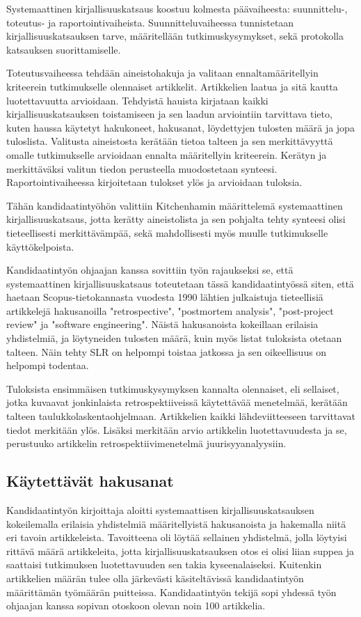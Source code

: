 Systemaattinen kirjallisuuskatsaus koostuu kolmesta päävaiheesta: suunnittelu-, toteutus- ja raportointivaiheista. Suunnitteluvaiheessa tunnistetaan kirjallisuuskatsauksen tarve, määritellään tutkimuskysymykset, sekä protokolla katsauksen suorittamiselle. \citep{Kitchenham2007}

Toteutusvaiheessa tehdään aineistohakuja ja valitaan ennaltamääritellyin kriteerein tutkimukselle olennaiset artikkelit. Artikkelien laatua ja sitä kautta luotettavuutta arvioidaan. Tehdyistä hauista kirjataan kaikki kirjallisuuskatsauksen toistamiseen ja sen laadun arviointiin tarvittava tieto, kuten haussa käytetyt hakukoneet, hakusanat, löydettyjen tulosten määrä ja jopa tuloslista. Valitusta aineistosta kerätään tietoa talteen ja sen merkittävyyttä omalle tutkimukselle arvioidaan ennalta määritellyin kriteerein. Kerätyn ja merkittäväksi valitun tiedon perusteella muodostetaan synteesi. Raportointivaiheessa kirjoitetaan tulokset ylös ja arvioidaan tuloksia. \citep{Kitchenham2007}

Tähän kandidaatintyöhön valittiin Kitchenhamin määrittelemä systemaattinen kirjallisuuskatsaus, jotta kerätty aineistolista ja sen pohjalta tehty synteesi olisi tieteellisesti merkittävämpää, sekä mahdollisesti myös muulle tutkimukselle käyttökelpoista.

Kandidaatintyön ohjaajan kanssa sovittiin työn rajaukseksi se, että systemaattinen kirjallisuuskatsaus toteutetaan tässä kandidaatintyössä siten, että haetaan Scopus-tietokannasta vuodesta 1990 lähtien julkaistuja tieteellisiä artikkelejä hakusanoilla "retrospective",  "postmortem analysis", "post-project review" ja "software engineering". Näistä hakusanoista kokeillaan erilaisia yhdistelmiä, ja löytyneiden tulosten määrä, kuin myös listat tuloksista otetaan talteen. Näin tehty SLR on helpompi toistaa jatkossa ja sen oikeellisuus on helpompi todentaa.

Tuloksista ensimmäisen tutkimuskysymyksen kannalta olennaiset, eli sellaiset, jotka kuvaavat jonkinlaista retrospektiiveissä käytettävää menetelmää, kerätään talteen taulukkolaskentaohjelmaan. Artikkelien kaikki lähdeviitteeseen tarvittavat tiedot merkitään ylös. Lisäksi merkitään arvio artikkelin luotettavuudesta ja se, perustuuko artikkelin retrospektiivimenetelmä juurisyyanalyysiin.

\subsection{Käytettävät hakusanat}
Kandidaatintyön kirjoittaja aloitti systemaattisen kirjallisuuskatsauksen kokeilemalla erilaisia yhdistelmiä määritellyistä hakusanoista ja hakemalla niitä eri tavoin artikkeleista. Tavoitteena oli löytää sellainen yhdistelmä, jolla löytyisi rittävä määrä artikkeleita, jotta kirjallisuuskatsauksen otos ei olisi liian suppea ja saattaisi tutkimuksen luotettavuuden sen takia kyseenalaiseksi. Kuitenkin artikkelien määrän tulee olla järkevästi käsiteltävissä kandidaatintyön määrittämän työmäärän puitteissa. Kandidaatintyön tekijä sopi yhdessä työn ohjaajan kanssa sopivan otoskoon olevan noin 100 artikkelia.

